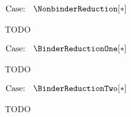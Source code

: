 $\text{Case: }\begin{array}{c} \NonbinderReduction[*] \end{array}$
\begin{proofcase}
    TODO
\end{proofcase}

$\text{Case: }\begin{array}{c} \BinderReductionOne[*] \end{array}$
\begin{proofcase}
    TODO
\end{proofcase}

$\text{Case: }\begin{array}{c} \BinderReductionTwo[*] \end{array}$
\begin{proofcase}
    TODO
\end{proofcase}

